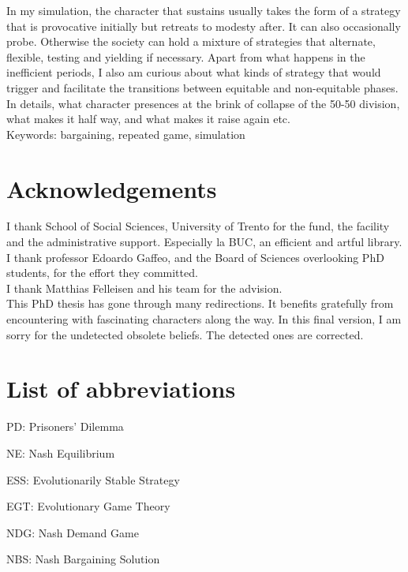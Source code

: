 \documentclass[12.5pt]{report}
\begin{document}
In my simulation, the character that sustains usually takes the form of a strategy that is provocative initially but retreats to modesty after. It can also occasionally probe. Otherwise the society can hold a mixture of strategies that alternate, flexible, testing and yielding if necessary. Apart from what happens in the inefficient periods, I also am curious about what kinds of strategy that would trigger and facilitate the transitions between equitable and non-equitable phases. In details, what character presences at the brink of collapse of the 50-50 division, what makes it half way, and what makes it raise again etc.\\


Keywords: bargaining, repeated game, simulation

\chapter*{Acknowledgements}

I thank School of Social Sciences, University of Trento for the fund, the facility and the administrative support. Especially la BUC, an efficient and artful library.\\

I thank professor Edoardo Gaffeo, and the Board of Sciences overlooking PhD students, for the effort they committed.\\

I thank Matthias Felleisen and his team for the advision.\\

This PhD thesis has gone through many redirections. It benefits gratefully from encountering with fascinating characters along the way. In this final version, I am sorry for the undetected obsolete beliefs. The detected ones are corrected.\\

\chapter*{List of abbreviations}

PD: Prisoners' Dilemma

NE: Nash Equilibrium

ESS: Evolutionarily Stable Strategy

EGT: Evolutionary Game Theory

NDG: Nash Demand Game

NBS: Nash Bargaining Solution\\
\end{document}
